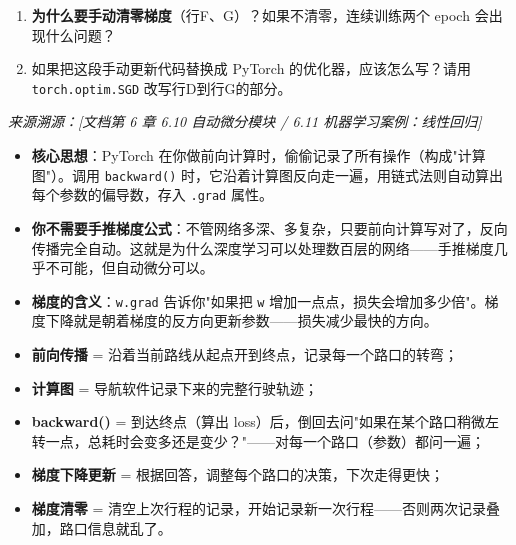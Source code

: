 \documentclass[a4paper,11pt]{ctexart}
\begin{document}
\begin{problembox}
\begin{enumerate}[(1)]
        \item \textbf{为什么要手动清零梯度}（行F、G）？如果不清零，连续训练两个 epoch 会出现什么问题？

        \item 如果把这段手动更新代码替换成 PyTorch 的优化器，应该怎么写？请用 \texttt{torch.optim.SGD} 改写行D到行G的部分。
    \end{enumerate}

    \vspace{0.2cm}
    {\color{gray}\small\textit{来源溯源：[文档第 6 章 6.10 自动微分模块 / 6.11 机器学习案例：线性回归]}}
\end{problembox}

\begin{beginnerbox}
    \begin{itemize}
        \item \textbf{核心思想}：PyTorch 在你做前向计算时，偷偷记录了所有操作（构成"计算图"）。调用 \texttt{backward()} 时，它沿着计算图反向走一遍，用链式法则自动算出每个参数的偏导数，存入 \texttt{.grad} 属性。
        \item \textbf{你不需要手推梯度公式}：不管网络多深、多复杂，只要前向计算写对了，反向传播完全自动。这就是为什么深度学习可以处理数百层的网络——手推梯度几乎不可能，但自动微分可以。
        \item \textbf{梯度的含义}：\texttt{w.grad} 告诉你"如果把 \texttt{w} 增加一点点，损失会增加多少倍"。梯度下降就是朝着梯度的反方向更新参数——损失减少最快的方向。
    \end{itemize}
\end{beginnerbox}

\begin{metaphorbox}
    \begin{itemize}
        \item \textbf{前向传播} = 沿着当前路线从起点开到终点，记录每一个路口的转弯；
        \item \textbf{计算图} = 导航软件记录下来的完整行驶轨迹；
        \item \textbf{backward()} = 到达终点（算出 loss）后，倒回去问"如果在某个路口稍微左转一点，总耗时会变多还是变少？"——对每一个路口（参数）都问一遍；
        \item \textbf{梯度下降更新} = 根据回答，调整每个路口的决策，下次走得更快；
        \item \textbf{梯度清零} = 清空上次行程的记录，开始记录新一次行程——否则两次记录叠加，路口信息就乱了。
    \end{itemize}
\end{metaphorbox}
\end{document}
